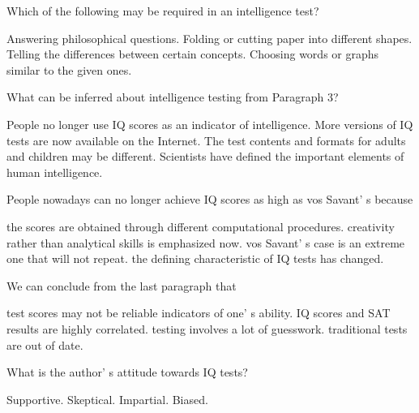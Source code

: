 \item Which of the following may be required in an intelligence test?
\begin{tasks}
	\task Answering philosophical questions.
	\task Folding or cutting paper into different shapes.
	\task Telling the differences between certain concepts.
	\task Choosing words or graphs similar to the given ones.
\end{tasks}
\item What can be inferred about intelligence testing from Paragraph 3?
\begin{tasks}
	\task People no longer use IQ scores as an indicator of intelligence.
	\task More versions of IQ tests are now available on the Internet.
	\task The test contents and formats for adults and children may be different.
	\task Scientists have defined the important elements of human intelligence.
\end{tasks}
\item People nowadays can no longer achieve IQ scores as high as vos Savant' s because
\begin{tasks}
	\task the scores are obtained through different computational procedures.
	\task creativity rather than analytical skills is emphasized now.
	\task vos Savant' s case is an extreme one that will not repeat.
	\task the defining characteristic of IQ tests has changed.
\end{tasks}
\item We can conclude from the last paragraph that
\begin{tasks}
	\task test scores may not be reliable indicators of one' s ability.
	\task IQ scores and SAT results are highly correlated.
	\task testing involves a lot of guesswork.
	\task traditional tests are out of date.
\end{tasks}
\item What is the author' s attitude towards IQ tests?
\begin{tasks}
	\task Supportive.
	\task Skeptical.
	\task Impartial.
	\task Biased.
\end{tasks}
